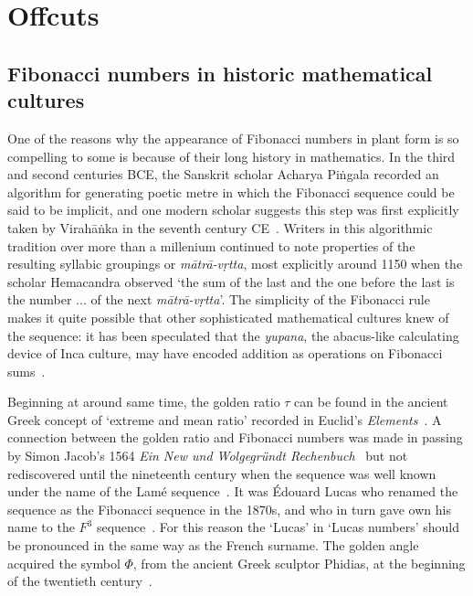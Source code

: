 \chapter{Offcuts}

% 
\section{Fibonacci numbers in historic mathematical cultures}
One of the reasons why the appearance of Fibonacci numbers in plant form is so compelling to some is because of their long history in mathematics. 
In the third and second centuries BCE, the Sanskrit scholar Acharya Piṅgala recorded an algorithm for generating poetic metre in which the Fibonacci sequence could be said to be implicit, and 
one modern scholar suggests this step was first explicitly taken by Virahāṅka in the seventh century CE~\autocite{singhSocalledFibonacciNumbers1985,velankarVrttajatisamuccayaKaviVirahanka1962}.  Writers in this algorithmic tradition over more than a millenium continued to note properties of the resulting syllabic groupings or \textit{mātrā-vṛtta}, most explicitly around 1150 when the scholar Hemacandra observed `the sum of the last and the one before the last is the number ... of the next \textit{mātrā-vṛtta}'\autocite{singhSocalledFibonacciNumbers1985}. The simplicity of the Fibonacci rule makes it quite possible that other sophisticated mathematical cultures knew of the sequence:  it has been speculated that the \textit{yupana}, the abacus-like calculating device of  Inca culture, may have encoded addition as operations on Fibonacci sums~\cite{leonardIncanAbacusCurious2010}.

Beginning at around same time, the golden ratio $\tau$ can be found in the ancient Greek concept of `extreme and mean ratio' recorded in Euclid's \textit{Elements}~\autocite{herz-fischlerMathematicalHistoryDivision1987}. 
A connection between the golden ratio and Fibonacci numbers was made in passing by Simon Jacob's 1564 \textit{Ein New und Wolgegründt Rechenbuch}~\cite{schreiberSupplementShallitsPaper1995} but not rediscovered until the nineteenth century when the sequence was well known under the name of the Lamé sequence~\autocite{lucasTheorieNombresPremiers1876}. It was Édouard Lucas who renamed the sequence as the Fibonacci sequence in the 1870s, and who in turn gave own his name to the $F^3$ sequence~\autocite{lucasTheorieNombresPremiers1876}. For this reason the `Lucas' in `Lucas numbers' should be pronounced in the same way as the French surname.  The golden angle acquired the symbol $\Phi$, from the ancient Greek sculptor Phidias, at the beginning of the twentieth century~\autocite{barrParametersBeauty1929}.

